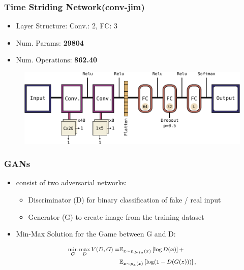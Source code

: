 \begin{frame}
  \frametitle{Time Striding Network(conv-jim)}
  \begin{itemize}
    \item Layer Structure: Conv.: 2, FC: 3
    \item Num. Params: \textbf{\num{29804}}
    \item Num. Operations: \textbf{\SI{862.40}{\kilo\ops}}
  \end{itemize}
  \begin{figure} \includegraphics[height=0.35\textheight]{../4_nn/figs/nn_arch_cnn_jim.pdf} \end{figure}
\end{frame}


\begin{frame}
  \frametitle{GANs}
  \begin{itemize}
    \item consist of two adversarial networks:
    \begin{itemize}
      \footnotesize
      \item Discriminator (D) for binary classification of fake / real input
      \item Generator (G) to create image from the training dataset
    \end{itemize}
    \item Min-Max Solution for the Game between G and D:
  \end{itemize}
  \begin{equation*}
    \footnotesize
    \begin{aligned}
      \underset{G}{\min} \, \underset{D}{\max} \, V(D, G) = & \mathbb{E}_{\bm{x} \sim p_{data}(\bm{x})}\left[ \log D(\bm{x}) \right] + \\
      & \mathbb{E}_{\bm{z} \sim p_{\bm{z}}(\bm{z})}\left[ \log (1 - D(G(\bm{z}))) \right],
    \end{aligned}
  \end{equation*}
\end{frame}


